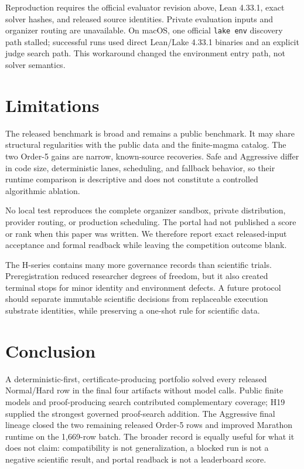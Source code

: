 \documentclass[10pt]{article}
\newcommand{\code}[1]{\texttt{#1}}
\begin{document}
Reproduction requires the official evaluator revision above, Lean 4.33.1, exact solver hashes, and released source identities. Private evaluation inputs and organizer routing are unavailable. On macOS, one official \code{lake env} discovery path stalled; successful runs used direct Lean/Lake 4.33.1 binaries and an explicit judge search path. This workaround changed the environment entry path, not solver semantics.

\section{Limitations}

The released benchmark is broad and remains a public benchmark. It may share structural regularities with the public data and the finite-magma catalog. The two Order-5 gains are narrow, known-source recoveries. Safe and Aggressive differ in code size, deterministic lanes, scheduling, and fallback behavior, so their runtime comparison is descriptive and does not constitute a controlled algorithmic ablation.

No local test reproduces the complete organizer sandbox, private distribution, provider routing, or production scheduling. The portal had not published a score or rank when this paper was written. We therefore report exact released-input acceptance and formal readback while leaving the competition outcome blank.

The H-series contains many more governance records than scientific trials. Preregistration reduced researcher degrees of freedom, but it also created terminal stops for minor identity and environment defects. A future protocol should separate immutable scientific decisions from replaceable execution substrate identities, while preserving a one-shot rule for scientific data.

\section{Conclusion}

A deterministic-first, certificate-producing portfolio solved every released Normal/Hard row in the final four artifacts without model calls. Public finite models and proof-producing search contributed complementary coverage; H19 supplied the strongest governed proof-search addition. The Aggressive final lineage closed the two remaining released Order-5 rows and improved Marathon runtime on the 1,669-row batch. The broader record is equally useful for what it does not claim: compatibility is not generalization, a blocked run is not a negative scientific result, and portal readback is not a leaderboard score.
\end{document}
